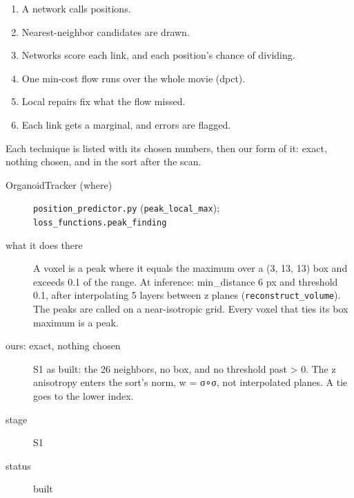 \begin{enumerate}
\item A network calls positions.
\item Nearest-neighbor candidates are drawn.
\item Networks score each link, and each position's chance of dividing.
\item One min-cost flow runs over the whole movie (dpct).
\item Local repairs fix what the flow missed.
\item Each link gets a marginal, and errors are flagged.
\end{enumerate}

Each technique is listed with its chosen numbers, then our form of it: exact, nothing chosen, and in the sort after the scan.

\begin{description}
\item[{OrganoidTracker (where)}] \texttt{position\_\allowbreak{}predictor.\allowbreak{}py} (\texttt{peak\_\allowbreak{}local\_\allowbreak{}max}); \texttt{loss\_\allowbreak{}functions.\allowbreak{}peak\_\allowbreak{}finding}
\item[{what it does there}] A voxel is a peak where it equals the maximum over a (3, 13, 13) box and exceeds 0.1 of the range. At inference: min\_\allowbreak{}distance 6 px and threshold 0.1, after interpolating 5 layers between z planes (\texttt{reconstruct\_\allowbreak{}volume}). The peaks are called on a near-isotropic grid. Every voxel that ties its box maximum is a peak.
\item[{ours: exact, nothing chosen}] S1 as built: the 26 neighbors, no box, and no threshold past > 0. The z anisotropy enters the sort's norm, w = σ∘σ, not interpolated planes. A tie goes to the lower index.
\item[{stage}] S1
\item[{status}] built
\end{description}

